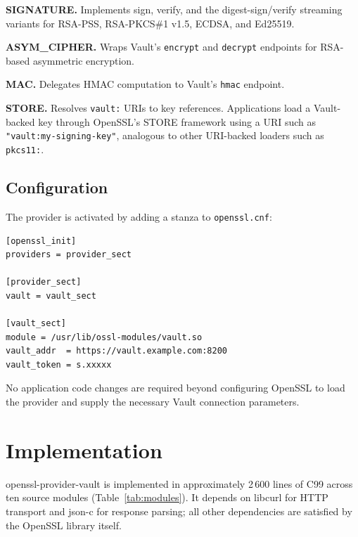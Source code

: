 \documentclass[sigconf,10pt]{acmart}
\begin{document}
\textbf{SIGNATURE.}  Implements sign, verify, and the digest-sign/verify
streaming variants for RSA-PSS, RSA-PKCS\#1 v1.5, ECDSA, and Ed25519.

\textbf{ASYM\_CIPHER.}  Wraps Vault's \texttt{encrypt} and \texttt{decrypt}
endpoints for RSA-based asymmetric encryption.

\textbf{MAC.}  Delegates HMAC computation to Vault's \texttt{hmac} endpoint.

\textbf{STORE.}  Resolves \texttt{vault:} URIs to key references.
Applications load a Vault-backed key through OpenSSL's STORE framework using
a URI such as \texttt{"vault:my-signing-key"}, analogous to other
URI-backed loaders such as \texttt{pkcs11:}.

\subsection{Configuration}
\label{sec:config}

The provider is activated by adding a stanza to \texttt{openssl.cnf}:

\begin{lstlisting}[caption={Minimal openssl.cnf for openssl-provider-vault.}]
[openssl_init]
providers = provider_sect

[provider_sect]
vault = vault_sect

[vault_sect]
module = /usr/lib/ossl-modules/vault.so
vault_addr  = https://vault.example.com:8200
vault_token = s.xxxxx
\end{lstlisting}

No application code changes are required beyond configuring OpenSSL to load
the provider and supply the necessary Vault connection parameters.

\section{Implementation}
\label{sec:impl}

openssl-provider-vault is implemented in approximately 2\,600 lines of C99 across
ten source modules (Table~\ref{tab:modules}).  It depends on libcurl for
HTTP transport and json-c for response parsing; all other dependencies are
satisfied by the OpenSSL library itself.
\end{document}
